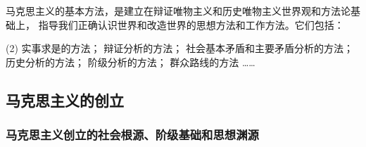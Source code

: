 \documentclass[10pt, UTF8]{book} %
\begin{document}
马克思主义的基本方法，是建立在辩证唯物主义和历史唯物主义世界观和方法论基础上，
指导我们正确认识世界和改造世界的思想方法和工作方法。它们包括：
\begin{tasks}(2)
    \task 实事求是的方法；
    \task 辩证分析的方法；
    \task 社会基本矛盾和主要矛盾分析的方法；
    \task 历史分析的方法；
    \task 阶级分析的方法；
    \task 群众路线的方法
    \task ……
\end{tasks}

\subsection{马克思主义的创立}



\subsubsection{马克思主义创立的社会根源、阶级基础和思想渊源}
\end{document}
